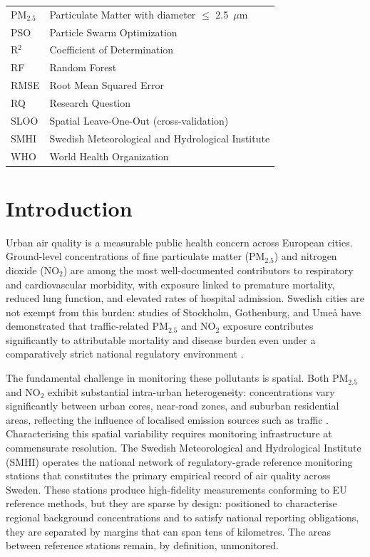 \documentclass[11pt,a4paper]{article}
\let\oldsection\section
\renewcommand{\section}{\FloatBarrier\oldsection}
\begin{document}
\begin{longtable}{p{2.6cm}p{11.5cm}}
PM$_{2.5}$ & Particulate Matter with diameter $\leq$ 2.5~$\mu$m \\
PSO & Particle Swarm Optimization \\
R$^2$ & Coefficient of Determination \\
RF & Random Forest \\
RMSE & Root Mean Squared Error \\
RQ & Research Question \\
SLOO & Spatial Leave-One-Out (cross-validation) \\
SMHI & Swedish Meteorological and Hydrological Institute \\
WHO & World Health Organization \\
\end{longtable}

\clearpage

\setcounter{page}{1}

\section{Introduction}
\label{sec:intro}

Urban air quality is a measurable public health concern across European cities. Ground-level concentrations of fine particulate matter (PM$_{2.5}$) and nitrogen dioxide (NO$_2$) are among the most well-documented contributors to respiratory and cardiovascular morbidity, with exposure linked to premature mortality, reduced lung function, and elevated rates of hospital admission. Swedish cities are not exempt from this burden: studies of Stockholm, Gothenburg, and Umeå have demonstrated that traffic-related PM$_{2.5}$ and NO$_2$ exposure contributes significantly to attributable mortality and disease burden even under a comparatively strict national regulatory environment \cite{segersson_sweden_health_2017}.

The fundamental challenge in monitoring these pollutants is spatial. Both PM$_{2.5}$ and NO$_2$ exhibit substantial intra-urban heterogeneity: concentrations vary significantly between urban cores, near-road zones, and suburban residential areas, reflecting the influence of localised emission sources such as traffic \cite{sweden_dispersion_2024}. Characterising this spatial variability requires monitoring infrastructure at commensurate resolution. The Swedish Meteorological and Hydrological Institute (SMHI) operates the national network of regulatory-grade reference monitoring stations that constitutes the primary empirical record of air quality across Sweden. These stations produce high-fidelity measurements conforming to EU reference methods, but they are sparse by design: positioned to characterise regional background concentrations and to satisfy national reporting obligations, they are separated by margins that can span tens of kilometres. The areas between reference stations remain, by definition, unmonitored.
\end{document}
